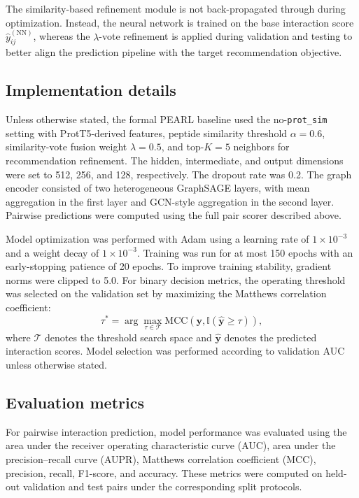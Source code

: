The similarity-based refinement module is not back-propagated through during optimization. Instead, the neural network is trained on the base interaction score $\hat{y}_{ij}^{(\mathrm{NN})}$, whereas the $\lambda$-vote refinement is applied during validation and testing to better align the prediction pipeline with the target recommendation objective.

\subsection{Implementation details}

Unless otherwise stated, the formal PEARL baseline used the no-\texttt{prot\_sim} setting with ProtT5-derived features, peptide similarity threshold $\alpha = 0.6$, similarity-vote fusion weight $\lambda = 0.5$, and top-$K = 5$ neighbors for recommendation refinement. The hidden, intermediate, and output dimensions were set to 512, 256, and 128, respectively. The dropout rate was 0.2. The graph encoder consisted of two heterogeneous GraphSAGE layers, with mean aggregation in the first layer and GCN-style aggregation in the second layer. Pairwise predictions were computed using the full pair scorer described above.

Model optimization was performed with Adam using a learning rate of $1\times10^{-3}$ and a weight decay of $1\times10^{-3}$. Training was run for at most 150 epochs with an early-stopping patience of 20 epochs. To improve training stability, gradient norms were clipped to 5.0. For binary decision metrics, the operating threshold was selected on the validation set by maximizing the Matthews correlation coefficient:
\begin{equation}
\tau^{*}
=
\arg\max_{\tau \in \mathcal{T}}
\mathrm{MCC}
\left(
\mathbf{y},
\mathbb{I}(\hat{\mathbf{y}} \ge \tau)
\right),
\end{equation}
where $\mathcal{T}$ denotes the threshold search space and $\hat{\mathbf{y}}$ denotes the predicted interaction scores. Model selection was performed according to validation AUC unless otherwise stated.

\subsection{Evaluation metrics}

For pairwise interaction prediction, model performance was evaluated using the area under the receiver operating characteristic curve (AUC), area under the precision--recall curve (AUPR), Matthews correlation coefficient (MCC), precision, recall, F1-score, and accuracy. These metrics were computed on held-out validation and test pairs under the corresponding split protocols.

